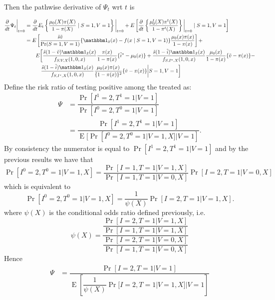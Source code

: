 \documentclass{article}
\DeclareMathOperator{\E}{E}
\begin{document}
Then the pathwise derivative of $\Psi_t$ wrt $t$ is

\begin{align*}
    \dfrac{\partial}{dt}\Psi_t\bigg\vert_{t=0}  &= \dfrac{\partial}{dt} E_t \left\{\dfrac{\mu_0(X)\pi(X)}{1 - \pi(X)}\mid S=1, V=1\right\}\bigg\vert_{t=0} + E\left[ \dfrac{\partial}{dt}\left\{\dfrac{\mu^t_0(X)\pi^t(X)}{1 - \pi^t(X)} \right\} \bigg\vert_{t=0}\mid S=1, V=1\right] \\
    &=E\left[\dfrac{\tilde s \tilde v}{\Pr(S=1, V=1)}\{\mathbbm 1_{\tilde x}(x)-f(x\mid S=1, V=1)\}\dfrac{\mu_0(x)\pi(x)}{1 - \pi(x)}\right] + \\
    & \qquad E\bigg[\dfrac{\tilde s(1-\tilde v)\mathbbm 1_{\tilde x}(x)}{f_{S, V, X}(1, 0, x)}\dfrac{\pi(x)}{1 - \pi(x)}\{\tilde i^* - \mu_0(x)\} + \dfrac{\tilde s(1-\tilde i)\mathbbm 1_{\tilde x}(x)}{f_{S, I^*, X}(1, 0, x)}\dfrac{\mu_0(x)}{1 - \pi(x)}\{\tilde v - \pi(x)\} - \\
    &\qquad \quad \dfrac{\tilde s(1 - \tilde i)\mathbbm 1_{\tilde x}(x)}{f_{S, I^*, X}(1, 0, x)} \dfrac{\mu_0(x)\pi(x)}{\{1 - \pi(x)\}^2} \{\tilde v - \pi(x)\} \bigg\vert S = 1, V = 1\bigg]\\
\end{align*}
Define the risk ratio of testing positive among the treated as:
\begin{align*}
    \Psi &= \dfrac{\Pr[I^1 = 2, T^1 = 1 | V = 1]}{\Pr[I^0 = 2, T^0 = 1 | V = 1]} \\
         &= \dfrac{\Pr[I^1 = 2, T^1 = 1 | V = 1]}{\E[\Pr[I^0 = 2, T^0 = 1 | V = 1, X] | V = 1]}.
\end{align*}
By consistency the numerator is equal to $\Pr[I^1 = 2, T^1 = 1 | V = 1]$ and by the previous results we have that 
\begin{equation*}
    \Pr[I^0 = 2, T^0 = 1 | V = 1, X] = \dfrac{\Pr[I = 1, T = 1 | V = 1, X]}{\Pr[I = 1, T = 1 | V = 0, X]} \Pr[I = 2, T = 1 | V = 0, X]
\end{equation*}
which is equivalent to 
\begin{equation*}
    \Pr[I^0 = 2, T^0 = 1 | V = 1, X] = \dfrac{1}{\psi(X)} \Pr[I = 2, T = 1 | V = 1, X].
\end{equation*}
where $\psi(X)$ is the conditional odds ratio defined previously, i.e.
\begin{equation*}
    \psi(X) = \dfrac{\dfrac{\Pr[I = 2, T = 1 | V = 1, X]}{\Pr[I = 1, T = 1 | V = 1, X]}}{\dfrac{\Pr[I = 2, T = 1 | V = 0, X]}{\Pr[I = 1, T = 1 | V = 0, X]}}
\end{equation*}
Hence
\begin{align*}
    \Psi &= \dfrac{\Pr[I = 2, T = 1 | V = 1]}{\E\left[\dfrac{1}{\psi(X)} \Pr[I = 2, T = 1 | V = 1, X] | V = 1\right]} \\
\end{align*}
\end{document}
